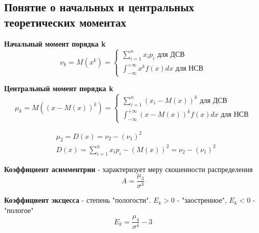     \subsection{Понятие о начальных и центральных теоретических моментах}
    \begin{opr}
        \textbf{Начальный момент порядка k}
        \begin{equation}
            \nu_{k} = M(x^{k}) = 
            \begin{cases}
                \sum_{i = 1}^{n} x_{i}p_{i} \text{  для ДСВ}\\
                \int_{-\infty}^{+\infty} x^{k} f(x)dx \text{  для НСВ}
            \end{cases}
        \end{equation}
    \end{opr}

    \begin{opr}
        \textbf{Центральный момент порядка k}
        \begin{equation}
            \mu_{k} = M((x - M(x))^{k}) = 
            \begin{cases}
                \sum_{i = 1}^{n} (x_{i} - M(x))^{k} \text{  для ДСВ}\\
                \int_{-\infty}^{+\infty} (x - M(x))^{k}f(x)dx \text{  для НСВ}
            \end{cases}
        \end{equation}
    \end{opr}

    \begin{ex}
        \begin{equation}
            \begin{align*}
                &\mu_{2} = D(x) = \nu_{2} - (\nu_{1})^{2}\\
                &D(x) = \sum_{i=1}^{n}x_{i}p_{i} - (M(x))^{2} = \nu_{2} - (\nu_{1})^{2}
            \end{align*}
        \end{equation}
    \end{ex}


    \begin{opr}
        \textbf{Коэффициент асимментрии} - характеризует меру скошенности распределения
        \begin{equation}
            A = \frac{\mu_{3}}{\sigma^{3}}
        \end{equation}
    \end{opr}
    \begin{opr}
        \textbf{Коэффициент эксцесса} - степень "пологости". 
        \(E_{k} > 0\) - "заостренное", \(E_{k} < 0\) - "пологое"
        \begin{equation}
            E_{k} = \frac{\mu_{4}}{\sigma^{4}} - 3
        \end{equation}
    \end{opr}



